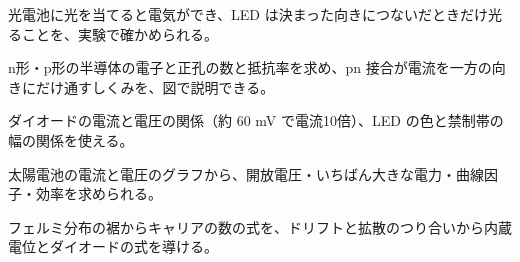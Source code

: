 \begin{furikaeri}
\begin{checklist}
\item 光電池に光を当てると電気ができ、LED は決まった向きにつないだときだけ光ることを、実験で確かめられる。
\item n形・p形の半導体の電子と正孔の数と抵抗率を求め、pn 接合が電流を一方の向きにだけ通すしくみを、図で説明できる。
\item ダイオードの電流と電圧の関係（約 60 mV で電流10倍）、LED の色と禁制帯の幅の関係を使える。
\item 太陽電池の電流と電圧のグラフから、開放電圧・いちばん大きな電力・曲線因子・効率を求められる。
\item フェルミ分布の裾からキャリアの数の式を、ドリフトと拡散のつり合いから内蔵電位とダイオードの式を導ける。
\end{checklist}
\end{furikaeri}
